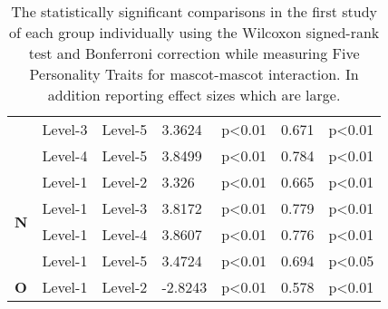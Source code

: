 \begin{table}
\begin{center}
\begin{tabular}{ |p{0.5cm}| p{1.5cm}|p{1.5cm}|p{1.3cm}| p{1.6cm}|p{1cm}|p{1.5cm}|  }
            &Level-3 &Level-5 &3.3624 &p<0.01 &0.671 &p<0.01\\
            &Level-4 &Level-5 &3.8499 &p<0.01 &0.784 &p<0.01\\
            \hline
            \hline
            \multirow{4}{*}{\textbf{N}}
            &Level-1 &Level-2 &3.326 &p<0.01 &0.665 &p<0.01\\
            &Level-1 &Level-3 &3.8172 &p<0.01 &0.779 &p<0.01\\
            &Level-1 &Level-4 &3.8607 &p<0.01 &0.776 &p<0.01\\
            &Level-1 &Level-5 &3.4724 &p<0.01 &0.694 &p<0.05\\
            \hline
            \hline
            \multirow{1}{*}{\textbf{O}}
            &Level-1 &Level-2 &-2.8243 &p<0.01 &0.578 &p<0.01\\
            \hline
        \end{tabular}
    \end{center}
    \captionsetup{width=13.5cm}
    \caption{The statistically significant comparisons in the first study of each group individually using the
    Wilcoxon signed-rank test and Bonferroni correction while measuring Five Personality
    Traits for mascot-mascot interaction.
    In addition reporting effect sizes which are large.}
    \label{table:wilcoxMM1}
\end{table}

